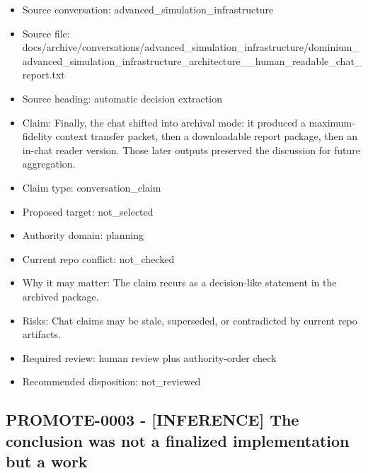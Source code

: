 \documentclass[11pt,a4paper]{report}
\begin{document}
\begin{itemize}
\item Source conversation: advanced\_simulation\_infrastructure
\item Source file: docs/archive/conversations/advanced\_simulation\_infrastructure/dominium\_advanced\_simulation\_infrastructure\_architecture\_\_human\_readable\_chat\_report.txt
\item Source heading: automatic decision extraction
\item Claim: Finally, the chat shifted into archival mode: it produced a maximum-fidelity context transfer packet, then a downloadable report package, then an in-chat reader version. Those later outputs preserved the discussion for future aggregation.
\item Claim type: conversation\_claim
\item Proposed target: not\_selected
\item Authority domain: planning
\item Current repo conflict: not\_checked
\item Why it may matter: The claim recurs as a decision-like statement in the archived package.
\item Risks: Chat claims may be stale, superseded, or contradicted by current repo artifacts.
\item Required review: human review plus authority-order check
\item Recommended disposition: not\_reviewed
\end{itemize}

\subsection{PROMOTE-0003 - [INFERENCE] The conclusion was not a finalized implementation but a work}
\end{document}
